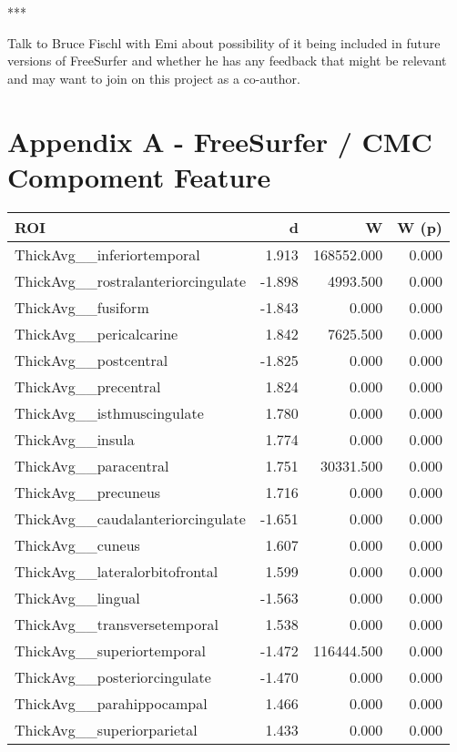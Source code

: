 \documentclass{article}
\begin{document}
***

Talk to Bruce Fischl with Emi about possibility of it being included in future versions of FreeSurfer and whether he has any feedback that might be relevant and may want to join on this project as a co-author.


\section{Appendix A - FreeSurfer / CMC Compoment Feature} \label{sec:appendix-a}


\begin{table}
\centering
\begin{tabular}{lrrr}
	\toprule
	ROI & d & W & W (p) \\
	\midrule
	ThickAvg\_\_inferiortemporal & 1.913 & 168552.000 & 0.000 \\
	ThickAvg\_\_rostralanteriorcingulate & -1.898 & 4993.500 & 0.000 \\
	ThickAvg\_\_fusiform & -1.843 & 0.000 & 0.000 \\
	ThickAvg\_\_pericalcarine & 1.842 & 7625.500 & 0.000 \\
	ThickAvg\_\_postcentral & -1.825 & 0.000 & 0.000 \\
	ThickAvg\_\_precentral & 1.824 & 0.000 & 0.000 \\
	ThickAvg\_\_isthmuscingulate & 1.780 & 0.000 & 0.000 \\
	ThickAvg\_\_insula & 1.774 & 0.000 & 0.000 \\
	ThickAvg\_\_paracentral & 1.751 & 30331.500 & 0.000 \\
	ThickAvg\_\_precuneus & 1.716 & 0.000 & 0.000 \\
	ThickAvg\_\_caudalanteriorcingulate & -1.651 & 0.000 & 0.000 \\
	ThickAvg\_\_cuneus & 1.607 & 0.000 & 0.000 \\
	ThickAvg\_\_lateralorbitofrontal & 1.599 & 0.000 & 0.000 \\
	ThickAvg\_\_lingual & -1.563 & 0.000 & 0.000 \\
	ThickAvg\_\_transversetemporal & 1.538 & 0.000 & 0.000 \\
	ThickAvg\_\_superiortemporal & -1.472 & 116444.500 & 0.000 \\
	ThickAvg\_\_posteriorcingulate & -1.470 & 0.000 & 0.000 \\
	ThickAvg\_\_parahippocampal & 1.466 & 0.000 & 0.000 \\
	ThickAvg\_\_superiorparietal & 1.433 & 0.000 & 0.000 \\

\end{tabular}
\end{table}
\end{document}
